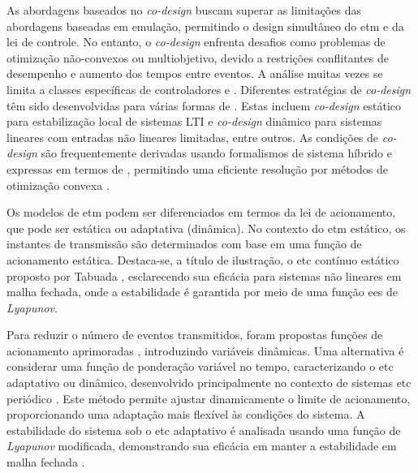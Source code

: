 As abordagens baseados no \textit{co-design} buscam superar as limitações das abordagens baseadas em emulação, permitindo o design simultâneo do \acrshort{etm} e da lei de controle. No entanto, o \textit{co-design} enfrenta desafios como problemas de otimização não-convexos ou multiobjetivo, devido a restrições conflitantes de desempenho e aumento dos tempos entre eventos. A análise muitas vezes se limita a classes específicas de controladores e  \cite{coutinho2021}. Diferentes estratégias de \textit{co-design} têm sido desenvolvidas para várias formas de . Estas incluem \textit{co-design} estático para estabilização local de sistemas LTI e \textit{co-design} dinâmico para sistemas lineares com entradas não lineares limitadas, entre outros. As condições de \textit{co-design} são frequentemente derivadas usando formalismos de sistema híbrido e expressas em termos de , permitindo uma eficiente resolução por métodos de otimização convexa \cite{coutinho2021}.

Os modelos de \acrshort{etm} podem ser diferenciados em termos da lei de acionamento, que pode ser estática ou adaptativa (dinâmica). No contexto do \acrshort{etm} estático, os instantes de transmissão são determinados com base em uma função de acionamento estática. Destaca-se, a título de ilustração, o \acrshort{etc} contínuo estático proposto por Tabuada \cite{Tabuada2007}, esclarecendo sua eficácia para sistemas não lineares em malha fechada, onde a estabilidade é garantida por meio de uma função \acrfull{ees} de \textit{Lyapunov}.

Para reduzir o número de eventos transmitidos, foram propostas funções de acionamento aprimoradas \cite{Wang2020,Zong2023,Ge2017, Ning2018, Wu2021}, introduzindo variáveis dinâmicas. Uma alternativa é considerar uma função de ponderação variável no tempo, caracterizando o \acrshort{etc} adaptativo ou dinâmico, desenvolvido principalmente no contexto de sistemas \acrshort{etc} periódico \cite{coutinho2021}. Este método permite ajustar dinamicamente o limite de acionamento, proporcionando uma adaptação mais flexível às condições do sistema. A estabilidade do sistema sob o \acrshort{etc} adaptativo é analisada usando uma função de \textit{Lyapunov} modificada, demonstrando sua eficácia em manter a estabilidade em malha fechada \cite{coutinho2021}.

